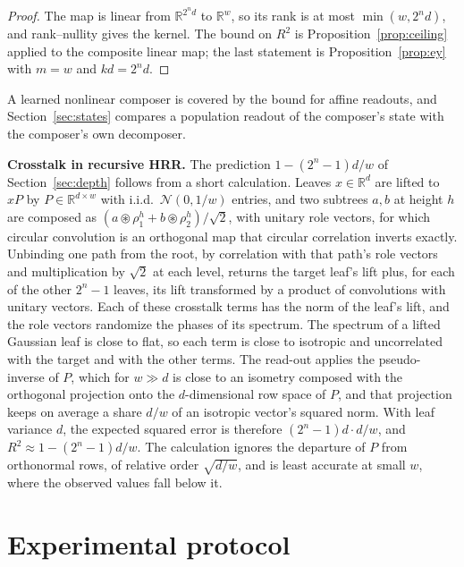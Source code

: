 \documentclass[10pt]{article}
\theoremstyle{plain}
\theoremstyle{remark}
\newcommand{\R}{\mathbb{R}}
\begin{document}
\begin{proof}
The map is linear from $\R^{2^n d}$ to $\R^w$, so its rank is at most $\min(w, 2^n d)$, and rank--nullity gives the kernel. The bound on $R^2$ is Proposition~\ref{prop:ceiling} applied to the composite linear map; the last statement is Proposition~\ref{prop:ey} with $m = w$ and $kd = 2^n d$.
\end{proof}

\noindent
A learned nonlinear composer is covered by the bound for affine readouts, and Section~\ref{sec:states} compares a population readout of the composer's state with the composer's own decomposer.

\noindent
\textbf{Crosstalk in recursive HRR.} The prediction $1 - (2^n - 1)d/w$ of Section~\ref{sec:depth} follows from a short calculation. Leaves $x \in \R^d$ are lifted to $xP$ by $P \in \R^{d \times w}$ with i.i.d.\ $\mathcal{N}(0, 1/w)$ entries, and two subtrees $a, b$ at height $h$ are composed as $(a \circledast \rho^h_1 + b \circledast \rho^h_2)/\sqrt{2}$, with unitary role vectors, for which circular convolution is an orthogonal map that circular correlation inverts exactly. Unbinding one path from the root, by correlation with that path's role vectors and multiplication by $\sqrt{2}$ at each level, returns the target leaf's lift plus, for each of the other $2^n - 1$ leaves, its lift transformed by a product of convolutions with unitary vectors. Each of these crosstalk terms has the norm of the leaf's lift, and the role vectors randomize the phases of its spectrum. The spectrum of a lifted Gaussian leaf is close to flat, so each term is close to isotropic and uncorrelated with the target and with the other terms. The read-out applies the pseudo-inverse of $P$, which for $w \gg d$ is close to an isometry composed with the orthogonal projection onto the $d$-dimensional row space of $P$, and that projection keeps on average a share $d/w$ of an isotropic vector's squared norm. With leaf variance $d$, the expected squared error is therefore $(2^n - 1)d \cdot d/w$, and $R^2 \approx 1 - (2^n - 1)d/w$. The calculation ignores the departure of $P$ from orthonormal rows, of relative order $\sqrt{d/w}$, and is least accurate at small $w$, where the observed values fall below it.

\section{Experimental protocol}
\label{app:protocol}
\end{document}
